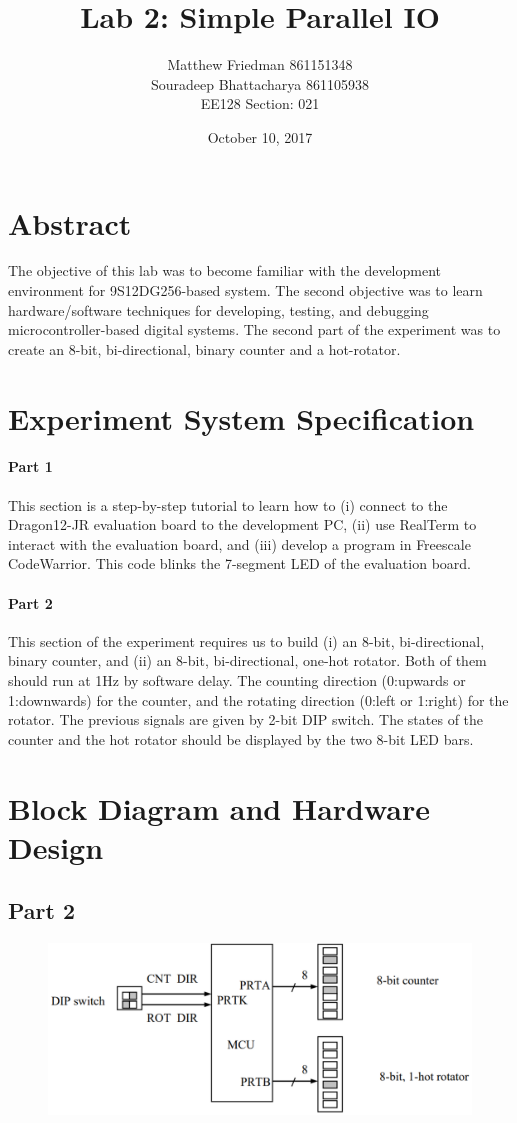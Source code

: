 \documentclass{article}
\title{Lab 2: Simple Parallel IO}
\date{October 10, 2017}
\author{Matthew Friedman 861151348\\Souradeep Bhattacharya 861105938\\EE128 Section: 021}
\begin{document}
\maketitle

\section*{Abstract}
The objective of this lab was to become familiar with the development environment for 9S12DG256-based system. The second objective was to learn hardware/software techniques for developing, testing, and debugging microcontroller-based digital systems. The second part of the experiment was to create an 8-bit, bi-directional, binary counter and a hot-rotator. 
\section*{Experiment System Specification}
\paragraph{Part 1}
This section is a step-by-step tutorial to learn how to (i) connect to the Dragon12-JR evaluation board to the development PC, (ii) use RealTerm to interact with the evaluation board, and (iii) develop a program in Freescale CodeWarrior. This code blinks the 7-segment LED of the evaluation board.
\paragraph{Part 2}
This section of the experiment requires us to build (i) an 8-bit, bi-directional, binary counter, and (ii) an 8-bit, bi-directional, one-hot rotator. Both of them should run at 1Hz by software delay. The counting direction (0:upwards or 1:downwards) for the counter, and the rotating direction (0:left or 1:right) for the rotator. The previous signals are given by 2-bit DIP switch. The states of the counter and the hot rotator should be displayed by the two 8-bit LED bars.

\section*{Block Diagram and Hardware Design}
\subsection*{Part 2}
\begin{figure}[H]
	\centering
	\includegraphics[width=1\textwidth]{Part2_Block_Diagram}
\end{figure}
\end{document}
